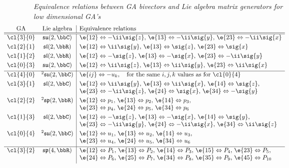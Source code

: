 \begin{unit}\textit{Equivalence relations between GA bivectors and Lie
  algebra matrix generators for low dimensional GA's}\label{bivectorAlgebraToLie}
\[\hspace*{-1.7cm}
\begin{array}{cc|l}
\textrm{GA}&\textrm{Lie algebra}&\textrm{Equivalence relations}\\
\hline\hline
\cl{3}{0}&\mathfrak{su}(2,\bbC)&\e{12}\Leftrightarrow -\ii\sig{z},\,\e{13}\Leftrightarrow -\ii\sig{y},\,\e{23}\Leftrightarrow -\ii\sig{x}\\[3pt]
\cl{2}{1}&\mathfrak{sl}(2,\bbR)&\e{12}\Leftrightarrow \ii\sig{y},\,\e{13}\Leftrightarrow \sig{z},\,\e{23}\Leftrightarrow \sig{x}\\[3pt]
\cl{1}{2}&\mathfrak{sl}(2,\bbR)&\e{12}\Leftrightarrow -\sig{z},\,\e{13}\Leftrightarrow -\sig{x},\,\e{23}\Leftrightarrow -\ii\sig{y}\\[3pt]
\cl{0}{3}&\mathfrak{su}(2,\bbC)&\e{12}\Leftrightarrow \ii\sig{z},\,\e{13}\Leftrightarrow \ii\sig{y},\,\e{23}\Leftrightarrow \ii\sig{x}\\[3pt]
\hline
\cl{4}{0}& {^2\mathfrak{su}}(2,\bbC)&\e{ij}\Leftrightarrow -u_k,\textrm{\quad for the same $i,j,k$ values as for \cl{0}{4}}\\[3pt]
\cl{3}{1}&\mathfrak{sl}(2,\bbC)&\e{12}\Leftrightarrow\ii\sig{y},\,\e{13}\Leftrightarrow\ii\sig{x},\,\e{14}\Leftrightarrow\sig{z},\\
&  &\e{23}\Leftrightarrow-\ii\sig{z},\,\e{24}\Leftrightarrow\sig{x},\,\e{34}\Leftrightarrow-\sig{y}\\[3pt]
\cl{2}{2}& {^2\mathfrak{sp}}(2,\bbR)&\e{12}\Leftrightarrow p_1,\,\e{13}\Leftrightarrow p_2,\,\e{14}\Leftrightarrow p_3,\\
&  &\e{23}\Leftrightarrow p_4,\,\e{24}\Leftrightarrow p_5,\,\e{34}\Leftrightarrow p_6\\[3pt]
%
\cl{1}{3}&\mathfrak{sl}(2,\bbC)&\e{12}\Leftrightarrow-\sig{z},\,\e{13}\Leftrightarrow-\sig{x},\,\e{14}\Leftrightarrow\sig{y},\\
&  &\e{23}\Leftrightarrow-\ii\sig{y},\,\e{24}\Leftrightarrow-\ii\sig{x},\,\e{34}\Leftrightarrow\ii\sig{z}\\[3pt]
%
\cl{0}{4}& {^2\mathfrak{su}}(2,\bbC)&\e{12}\Leftrightarrow u_1,\,\e{13}\Leftrightarrow u_2,\,\e{14}\Leftrightarrow u_3,\\
& &\e{23}\Leftrightarrow u_4,\,\e{24}\Leftrightarrow u_5,\,\e{34}\Leftrightarrow u_6\\[3pt]
\hline
\cl{3}{2}& {\mathfrak{sp}}(4,\bbR)&\e{12}\Leftrightarrow P_1,\,\e{13}\Leftrightarrow P_2,\,\e{14}\Leftrightarrow P_3,\,\e{15}\Leftrightarrow P_4,\,\e{23}\Leftrightarrow P_5,\\
        & &\e{24}\Leftrightarrow P_6,\,\e{25}\Leftrightarrow P_7,\,\e{34}\Leftrightarrow P_8,\,\e{35}\Leftrightarrow P_9,\,\e{45}\Leftrightarrow P_{10}\\[3pt]


\end{array}\]
\end{unit}
